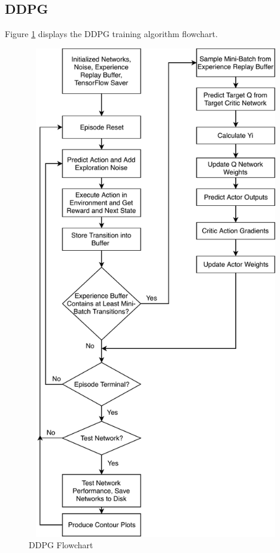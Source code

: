 \subsection{DDPG}
Figure \ref{fig:ddpg_flow} displays the DDPG training algorithm flowchart.
\begin{figure}[H]   %
	\centering \includegraphics[width=6in, height=8.5in, keepaspectratio]{figures/ddpg_flow.pdf}
	\caption{DDPG Flowchart}\label{fig:ddpg_flow}
\end{figure}
